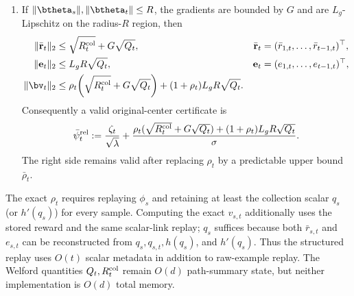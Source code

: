 \begin{lemma}
\begin{enumerate}[nosep,label=(\alph*),leftmargin=1.6em]
\item If $\|\btheta_s\|,\|\btheta_t\|\le R$, the gradients are bounded by
$G$ and are $L_g$-Lipschitz on the radius-$R$ region, then
\begin{align}
 \|\bar{\mathbf r}_t\|_2
 &\le\sqrt{R_t^{\rm col}}+G\sqrt{Q_t},
 &\bar{\mathbf r}_t&=(\bar r_{1,t},\ldots,\bar r_{t-1,t})^\top,
 \label{eq:relative-link-rbar}\\
 \|\mathbf e_t\|_2
 &\le L_gR\sqrt{Q_t},
 &\mathbf e_t&=(e_{1,t},\ldots,e_{t-1,t})^\top,
 \label{eq:relative-link-e}\\
 \|\bv_t\|_2
 &\le \rho_t\!\left(\sqrt{R_t^{\rm col}}+G\sqrt{Q_t}\right)
 +(1+\rho_t)L_gR\sqrt{Q_t}.
 \label{eq:relative-link-v-bound}
\end{align}
Consequently a valid original-center certificate is
\begin{equation}\label{eq:relative-link-psi}
 \bar\psi_t^{\rm rel}:=\frac{\zeta_t}{\sqrt\lambda}
 +\frac{\rho_t(\sqrt{R_t^{\rm col}}+G\sqrt{Q_t})
 +(1+\rho_t)L_gR\sqrt{Q_t}}{\sigma}.
\end{equation}
The right side remains valid after replacing $\rho_t$ by a predictable upper
bound $\bar\rho_t$.
\end{enumerate}
The exact $\rho_t$ requires replaying $\phi_s$ and retaining at least the
collection scalar $q_s$ (or $h'(q_s)$) for every sample.  Computing the exact
$v_{s,t}$ additionally uses the stored reward and the same scalar-link replay;
$q_s$ suffices because both $\bar r_{s,t}$ and $e_{s,t}$ can be reconstructed
from $q_s,q_{s,t},h(q_s)$, and $h'(q_s)$.  Thus the structured replay uses
$O(t)$ scalar metadata in addition to raw-example replay.  The Welford
quantities $Q_t,R_t^{\rm col}$ remain $O(d)$ path-summary state, but neither
implementation is $O(d)$ total memory.
\end{lemma}
